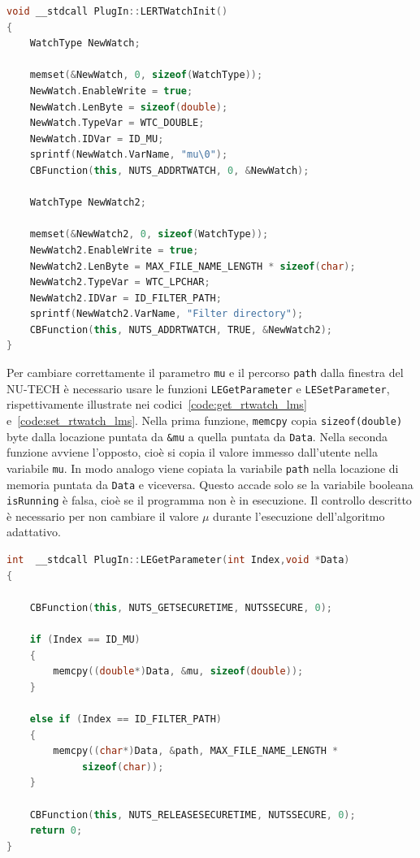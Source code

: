 \documentclass[12pt,a4paper,titlepage]{article}
\begin{document}
\begin{lstlisting}[language=cpp, label=code:rtwatch_lms, caption = Creazione RT Watch, breaklines = false, captionpos = b]
void __stdcall PlugIn::LERTWatchInit()
{
	WatchType NewWatch;

	memset(&NewWatch, 0, sizeof(WatchType));
	NewWatch.EnableWrite = true;
	NewWatch.LenByte = sizeof(double);
	NewWatch.TypeVar = WTC_DOUBLE;
	NewWatch.IDVar = ID_MU;
	sprintf(NewWatch.VarName, "mu\0");
	CBFunction(this, NUTS_ADDRTWATCH, 0, &NewWatch);
	
	WatchType NewWatch2;

	memset(&NewWatch2, 0, sizeof(WatchType));
	NewWatch2.EnableWrite = true;
	NewWatch2.LenByte = MAX_FILE_NAME_LENGTH * sizeof(char);
	NewWatch2.TypeVar = WTC_LPCHAR;
	NewWatch2.IDVar = ID_FILTER_PATH;
	sprintf(NewWatch2.VarName, "Filter directory");
	CBFunction(this, NUTS_ADDRTWATCH, TRUE, &NewWatch2);
}
\end{lstlisting}
Per cambiare correttamente il parametro \texttt{mu} e il percorso \texttt{path} dalla finestra del NU-TECH è necessario usare le funzioni \texttt{LEGetParameter} e \texttt{LESetParameter}, rispettivamente illustrate nei codici~\ref{code:get_rtwatch_lms} e~\ref{code:set_rtwatch_lms}. Nella prima funzione, \texttt{memcpy} copia \texttt{sizeof(double)} byte dalla locazione puntata da \texttt{\&mu} a quella puntata da \texttt{Data}. Nella seconda funzione avviene l'opposto, cioè si copia il valore immesso dall'utente nella variabile \texttt{mu}. In modo analogo viene copiata la variabile \texttt{path} nella locazione di memoria puntata da \texttt{Data} e viceversa. Questo accade solo se la variabile booleana \texttt{isRunning} è falsa, cioè se il programma non è in esecuzione. Il controllo descritto è necessario per non cambiare il valore $\mu$ durante l'esecuzione dell'algoritmo adattativo.

\begin{lstlisting}[language=cpp, label=code:get_rtwatch_lms, caption = Funzione \texttt{LEGetParameter}, breaklines = false, captionpos = b]
int  __stdcall PlugIn::LEGetParameter(int Index,void *Data)
{

	CBFunction(this, NUTS_GETSECURETIME, NUTSSECURE, 0);

	if (Index == ID_MU)
	{
		memcpy((double*)Data, &mu, sizeof(double));
	}

	else if (Index == ID_FILTER_PATH)
	{
		memcpy((char*)Data, &path, MAX_FILE_NAME_LENGTH *
			 sizeof(char));
	}
	
	CBFunction(this, NUTS_RELEASESECURETIME, NUTSSECURE, 0);
	return 0;
}
\end{lstlisting}
\end{document}
